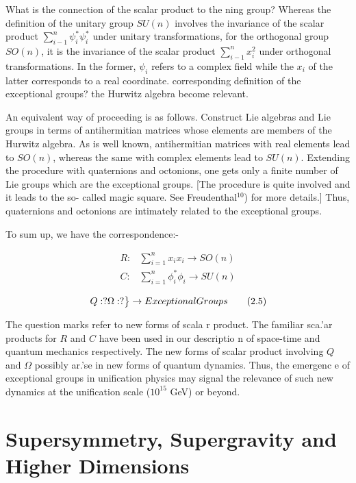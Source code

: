 What is the connection of the scalar product to the ning
group? Whereas the definition of the unitary group $SU(n)$ involves the invariance of the scalar product $\sum\limits_{i-1}^{n} \psi_{i}^{\ast} \psi_{i}^{\ast}$
under unitary transformations, for the orthogonal group $SO(n)$, it is the invariance of the
scalar product $\sum\limits_{i-1}^{n} x_{i}^{2}$ under orthogonal transformations. In the former, $\psi_{i}$ refers to a
complex field while the $x_{i}$ of the latter corresponds to a real coordinate.
corresponding definition of the exceptional groups?
the Hurwitz algebra become relevant.

An equivalent way of proceeding is as follows.
Construct Lie algebras and Lie groups
in terms of antihermitian matrices whose elements are members of the Hurwitz algebra.
As is well known, antihermitian matrices with real elements lead to $SO(n)$, whereas the
same with complex elements lead to $SU(n)$.
Extending the procedure with quaternions
and octonions, one gets only a finite number of Lie groups which are the exceptional
groups. [The procedure is quite involved and it leads to the so- called magic square. See
Freudenthal$^{10}$) for more details.] Thus, quaternions and octonions are intimately related
to the exceptional groups.

To sum up, we have the correspondence:-

\begin{align}
R : &\sum_{i=1}^{n} x_{i} x_{i} \rightarrow SO(n)\\
C: &\sum_{i=1}^{n}\phi_{i}^{\ast} \phi_{i} \rightarrow SU(n)\\
\end{align}
\begin{equation*}
\begin{rcases}
Q : ?
\Omega : ?
\end{rcases}
\rightarrow {Exceptional Groups} \tag{2.5}
\end{equation*}

The question marks refer to new forms of scala
r product. The familiar sca.'ar products
for $R$ and $C$ have been used in our descriptio
n of space-time and quantum mechanics
respectively. The new forms of scalar product
involving $Q$ and $\Omega$ possibly ar.’se in new
forms of quantum dynamics. Thus, the emergenc
e of exceptional groups in unification
physics may signal the relevance of such
new dynamics at the unification scale ($10^{15}$
GeV)
or beyond.

\section{Supersymmetry, Supergravity and Higher Dimensions}

